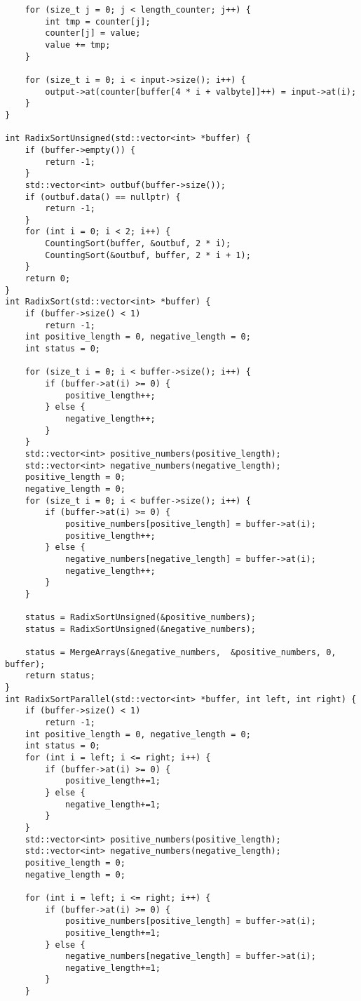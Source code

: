 \documentclass{report}
\begin{document}
\begin{lstlisting}
    for (size_t j = 0; j < length_counter; j++) {
        int tmp = counter[j];
        counter[j] = value;
        value += tmp;
    }

    for (size_t i = 0; i < input->size(); i++) {
        output->at(counter[buffer[4 * i + valbyte]]++) = input->at(i);
    }
}

int RadixSortUnsigned(std::vector<int> *buffer) {
    if (buffer->empty()) {
        return -1;
    }
    std::vector<int> outbuf(buffer->size());
    if (outbuf.data() == nullptr) {
        return -1;
    }
    for (int i = 0; i < 2; i++) {
        CountingSort(buffer, &outbuf, 2 * i);
        CountingSort(&outbuf, buffer, 2 * i + 1);
    }
    return 0;
}
int RadixSort(std::vector<int> *buffer) {
    if (buffer->size() < 1)
        return -1;
    int positive_length = 0, negative_length = 0;
    int status = 0;

    for (size_t i = 0; i < buffer->size(); i++) {
        if (buffer->at(i) >= 0) {
            positive_length++;
        } else {
            negative_length++;
        }
    }
    std::vector<int> positive_numbers(positive_length);
    std::vector<int> negative_numbers(negative_length);
    positive_length = 0;
    negative_length = 0;
    for (size_t i = 0; i < buffer->size(); i++) {
        if (buffer->at(i) >= 0) {
            positive_numbers[positive_length] = buffer->at(i);
            positive_length++;
        } else {
            negative_numbers[negative_length] = buffer->at(i);
            negative_length++;
        }
    }

    status = RadixSortUnsigned(&positive_numbers);
    status = RadixSortUnsigned(&negative_numbers);

    status = MergeArrays(&negative_numbers,  &positive_numbers, 0,  buffer);
    return status;
}
int RadixSortParallel(std::vector<int> *buffer, int left, int right) {
    if (buffer->size() < 1)
        return -1;
    int positive_length = 0, negative_length = 0;
    int status = 0;
    for (int i = left; i <= right; i++) {
        if (buffer->at(i) >= 0) {
            positive_length+=1;
        } else {
            negative_length+=1;
        }
    }
    std::vector<int> positive_numbers(positive_length);
    std::vector<int> negative_numbers(negative_length);
    positive_length = 0;
    negative_length = 0;

    for (int i = left; i <= right; i++) {
        if (buffer->at(i) >= 0) {
            positive_numbers[positive_length] = buffer->at(i);
            positive_length+=1;
        } else {
            negative_numbers[negative_length] = buffer->at(i);
            negative_length+=1;
        }
    }


\end{lstlisting}
\end{document}
